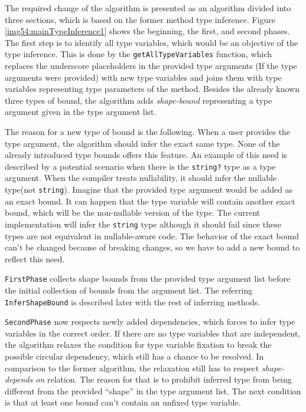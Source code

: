 The required change of the algorithm is presented as an algorithm divided into three sections, which is based on the former method type inference. 
Figure \ref{img54:mainTypeInference1} shows the beginning, the first, and second phases. 
The first step is to identify all type variables, which would be an objective of the type inference. 
This is done by the \texttt{getAllTypeVariables} function, which replaces the underscore placeholders in the provided type arguments (If the type arguments were provided) with new type variables and joins them with type variables representing type parameters of
the method.
Besides the already known three types of bound, the algorithm adds \textit{shape-bound} representing a type argument given in the type argument list.
\par
The reason for a new type of bound is the following. 
When a user provides the type argument, the algorithm should infer the exact same type. 
None of the already introduced type bounds offers this feature. 
An example of this need is described by a potential scenario when there is the \texttt{string?} type as a type argument. 
When the compiler treats nullability, it should infer the nullable type(not \texttt{string}). 
Imagine that the provided type argument would be added as an exact bound.
It can happen that the type variable will contain another exact bound, which will be the non-nullable version of the type.
The current implementation will infer the \texttt{string} type although it should fail since these types are not equivalent in nullable-aware code.
The behavior of the exact bound can’t be changed because of breaking changes, so we have to add a new bound to reflect this need.
\par
\texttt{FirstPhase} collects shape bounds from the provided type argument list before the initial  collection of bounds from the argument list.
The referring \texttt{InferShapeBound} is described later with the rest of inferring methods.
\par
\texttt{SecondPhase} now respects newly added dependencies, which forces to infer type variables in the correct order. 
If there are no type variables that are independent, the algorithm relaxes the condition for type variable fixation to break the possible circular dependency, which still has a chance to be resolved. 
In comparison to the former algorithm, the relaxation still has to respect \textit{shape-depends on} relation. 
The reason for that is to prohibit inferred type from being different from the provided ``shape'' in the type argument list. 
The next condition is that at least one bound can’t contain an unfixed type variable. 
